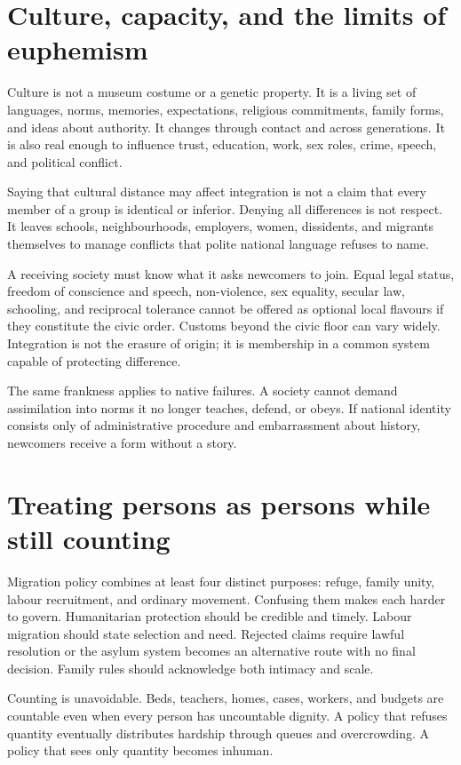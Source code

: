 \documentclass[12pt,a4paper]{book}
\begin{document}
\section{Culture, capacity, and the limits of euphemism}

Culture is not a museum costume or a genetic property.  It is a living set of
languages, norms, memories, expectations, religious commitments, family forms,
and ideas about authority.  It changes through contact and across generations.
It is also real enough to influence trust, education, work, sex roles, crime,
speech, and political conflict.

Saying that cultural distance may affect integration is not a claim that every
member of a group is identical or inferior.  Denying all differences is not
respect.  It leaves schools, neighbourhoods, employers, women, dissidents, and
migrants themselves to manage conflicts that polite national language refuses
to name.

A receiving society must know what it asks newcomers to join.  Equal legal
status, freedom of conscience and speech, non-violence, sex equality, secular
law, schooling, and reciprocal tolerance cannot be offered as optional local
flavours if they constitute the civic order.  Customs beyond the civic floor
can vary widely.  Integration is not the erasure of origin; it is membership in
a common system capable of protecting difference.

The same frankness applies to native failures.  A society cannot demand
assimilation into norms it no longer teaches, defend, or obeys.  If national
identity consists only of administrative procedure and embarrassment about
history, newcomers receive a form without a story.

\section{Treating persons as persons while still counting}

Migration policy combines at least four distinct purposes: refuge, family
unity, labour recruitment, and ordinary movement.  Confusing them makes each
harder to govern.  Humanitarian protection should be credible and timely.
Labour migration should state selection and need.  Rejected claims require
lawful resolution or the asylum system becomes an alternative route with no
final decision.  Family rules should acknowledge both intimacy and scale.

Counting is unavoidable.  Beds, teachers, homes, cases, workers, and budgets
are countable even when every person has uncountable dignity.  A policy that
refuses quantity eventually distributes hardship through queues and
overcrowding.  A policy that sees only quantity becomes inhuman.
\end{document}
